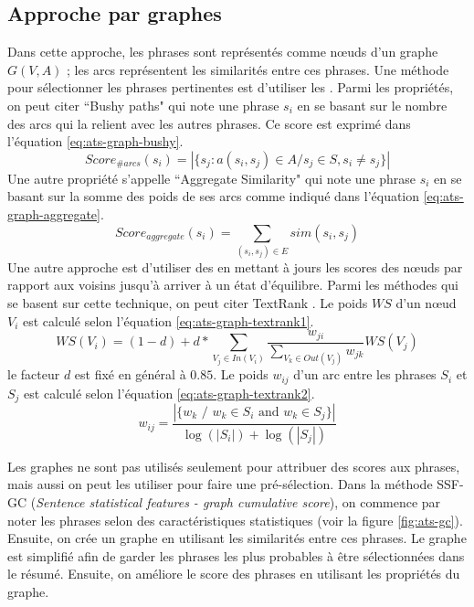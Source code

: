 \documentclass{KodeBook}
\begin{document}
\subsection{Approche par graphes}

Dans cette approche, les phrases sont représentés comme nœuds d'un graphe $G(V, A)$ ; les arcs représentent les similarités entre ces phrases. 
Une méthode pour sélectionner les phrases pertinentes est d'utiliser les . 
Parmi les propriétés, on peut citer ``Bushy paths" qui note une phrase $s_i$ en se basant sur le nombre des arcs qui la relient avec les autres phrases.
Ce score est exprimé dans l'équation \ref{eq:ats-graph-bushy}.
\begin{equation}\label{eq:ats-graph-bushy}
Score_{\#arcs}(s_i) = |\{ s_j : a(s_i, s_j) \in A / s_j \in S, s_i \neq s_j \}|
\end{equation}
Une autre propriété s'appelle ``Aggregate Similarity" qui note une phrase $s_i$ en se basant sur la somme des poids de ses arcs comme indiqué dans l'équation \ref{eq:ats-graph-aggregate}.
\begin{equation}\label{eq:ats-graph-aggregate}
Score_{aggregate}(s_i) = \sum\limits_{(s_i, s_j) \in E} sim(s_i, s_j)
\end{equation}
Une autre approche est d'utiliser des  en mettant à jours les scores des nœuds par rapport aux voisins jusqu'à arriver à un état d'équilibre. 
Parmi les méthodes qui se basent sur cette technique, on peut citer TextRank \cite{04-mihalcea-tarau}. 
Le poids $WS$ d'un nœud $V_i$ est calculé selon l'équation \ref{eq:ats-graph-textrank1}.
\begin{equation}\label{eq:ats-graph-textrank1}
WS(V_i) = ( 1 - d) + d * \sum\limits_{V_j \in In(V_i)} \frac{w_{ji}}{\sum\limits_{V_k \in Out(V_j)} w_{jk}} WS(V_j)
\end{equation}
le facteur $ d $ est fixé en général à $ 0.85 $.
Le poids $w_{ij}$ d'un arc entre les phrases $S_i$ et $S_j$ est calculé selon l'équation \ref{eq:ats-graph-textrank2}.
\begin{equation}\label{eq:ats-graph-textrank2}
w_{ij} = \frac{|\{w_k \text{ / } w_k \in S_i \text{ and } w_k \in S_j\}|}{\log(|S_i|) + \log(|S_j|)}
\end{equation}

Les graphes ne sont pas utilisés seulement pour attribuer des scores aux phrases, mais aussi on peut les utiliser pour faire une pré-sélection.
Dans la méthode SSF-GC (\textit{Sentence statistical features - graph cumulative score})\cite{21-aries-al}, on commence par noter les phrases selon des caractéristiques statistiques (voir la figure \ref{fig:ats-gc}). 
Ensuite, on crée un graphe en utilisant les similarités entre ces phrases. 
Le graphe est simplifié afin de garder les phrases les plus probables à être sélectionnées dans le résumé. 
Ensuite, on améliore le score des phrases en utilisant les propriétés du graphe.
\end{document}
